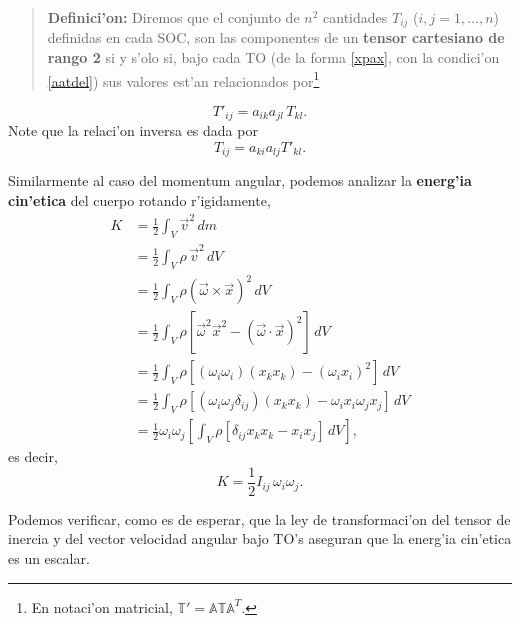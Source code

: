\begin{quotation}
\textbf{Definici'on:} Diremos que el conjunto de $n^2$ cantidades $T_{ij}$ ($i,j=1,\dots, n$) definidas en cada SOC, son las componentes de un \textbf{tensor cartesiano de rango 2} si y s'olo si, bajo cada TO (de la forma \eqref{xpax}, con la condici'on \eqref{aatdel}) sus valores est'an relacionados por\footnote{En notaci'on matricial, $\mathbb{T}'=\mathbb{A}\mathbb{T}\mathbb{A}^T$.} 
\end{quotation}
\begin{equation}\label{dT2}
\boxed{T'_{ij}=a_{ik}a_{jl}\,T_{kl}.}
\end{equation}
Note que la relaci'on inversa es dada por
\begin{equation}
T_{ij}=a_{ki}a_{lj}T'_{kl}.
\end{equation}

Similarmente al caso del momentum angular, podemos analizar la \textbf{energ'ia cin'etica} del cuerpo rotando r'igidamente,
\begin{align}
K &=\frac{1}{2}\int_V \vec{v}^2\,dm \\
&= \frac{1}{2}\int_V \rho\,\vec{v}^2\,dV \\
&= \frac{1}{2}\int_V \rho\left(\vec{\omega}\times\vec{x}\right)^2\,dV \\
&= \frac{1}{2}\int_V \rho\left[\vec{\omega}^2\vec{x}^2-(\vec{\omega}\cdot\vec{x})^2\right]\,dV \\
&= \frac{1}{2}\int_V\rho \left[(\omega_i\omega_i)(x_kx_k)-(\omega_ix_i)^2\right]\,dV \\
&= \frac{1}{2}\int_V\rho \left[(\omega_i\omega_j\delta_{ij})(x_kx_k)-\omega_ix_i\omega_jx_j\right]\,dV \\
&= \frac{1}{2}\omega_i\omega_j\left[\int_V\rho \left[\delta_{ij}x_kx_k-x_ix_j\right]\,dV\right] ,
\end{align}
es decir,
\begin{equation}
\boxed{K=\frac{1}{2}I_{ij}\,\omega_i\omega_j.}
\end{equation}

Podemos verificar, como es de esperar, que la ley de transformaci'on del tensor de inercia y del vector velocidad angular bajo TO's aseguran que la energ'ia cin'etica es un escalar.

